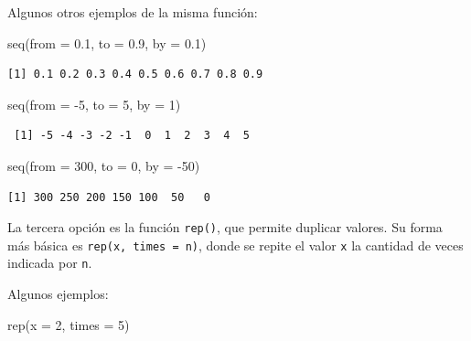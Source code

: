 \documentclass[
  spanish,
  letterpaper,
  DIV=11,
  numbers=noendperiod]{scrreprt}
\newenvironment{Shaded}{\begin{snugshade}}{\end{snugshade}}
\newcommand{\AttributeTok}[1]{\textcolor[rgb]{0.40,0.45,0.13}{#1}}
\newcommand{\DecValTok}[1]{\textcolor[rgb]{0.68,0.00,0.00}{#1}}
\newcommand{\FloatTok}[1]{\textcolor[rgb]{0.68,0.00,0.00}{#1}}
\newcommand{\FunctionTok}[1]{\textcolor[rgb]{0.28,0.35,0.67}{#1}}
\newcommand{\NormalTok}[1]{\textcolor[rgb]{0.00,0.23,0.31}{#1}}
\newcommand{\SpecialCharTok}[1]{\textcolor[rgb]{0.37,0.37,0.37}{#1}}
\begin{document}
Algunos otros ejemplos de la misma función:

\begin{Shaded}
\begin{Highlighting}[]
\FunctionTok{seq}\NormalTok{(}\AttributeTok{from =} \FloatTok{0.1}\NormalTok{, }\AttributeTok{to =} \FloatTok{0.9}\NormalTok{, }\AttributeTok{by =} \FloatTok{0.1}\NormalTok{)}
\end{Highlighting}
\end{Shaded}

\begin{verbatim}
[1] 0.1 0.2 0.3 0.4 0.5 0.6 0.7 0.8 0.9
\end{verbatim}

\begin{Shaded}
\begin{Highlighting}[]
\FunctionTok{seq}\NormalTok{(}\AttributeTok{from =} \SpecialCharTok{{-}}\DecValTok{5}\NormalTok{, }\AttributeTok{to =} \DecValTok{5}\NormalTok{, }\AttributeTok{by =} \DecValTok{1}\NormalTok{)}
\end{Highlighting}
\end{Shaded}

\begin{verbatim}
 [1] -5 -4 -3 -2 -1  0  1  2  3  4  5
\end{verbatim}

\begin{Shaded}
\begin{Highlighting}[]
\FunctionTok{seq}\NormalTok{(}\AttributeTok{from =} \DecValTok{300}\NormalTok{, }\AttributeTok{to =} \DecValTok{0}\NormalTok{, }\AttributeTok{by =} \SpecialCharTok{{-}}\DecValTok{50}\NormalTok{)}
\end{Highlighting}
\end{Shaded}

\begin{verbatim}
[1] 300 250 200 150 100  50   0
\end{verbatim}

La tercera opción es la función \texttt{rep()}, que permite duplicar
valores. Su forma más básica es \texttt{rep(x,\ times\ =\ n)}, donde se
repite el valor \texttt{x} la cantidad de veces indicada por \texttt{n}.

Algunos ejemplos:

\begin{Shaded}
\begin{Highlighting}[]
\FunctionTok{rep}\NormalTok{(}\AttributeTok{x =} \DecValTok{2}\NormalTok{, }\AttributeTok{times =} \DecValTok{5}\NormalTok{)}
\end{Highlighting}
\end{Shaded}
\end{document}
